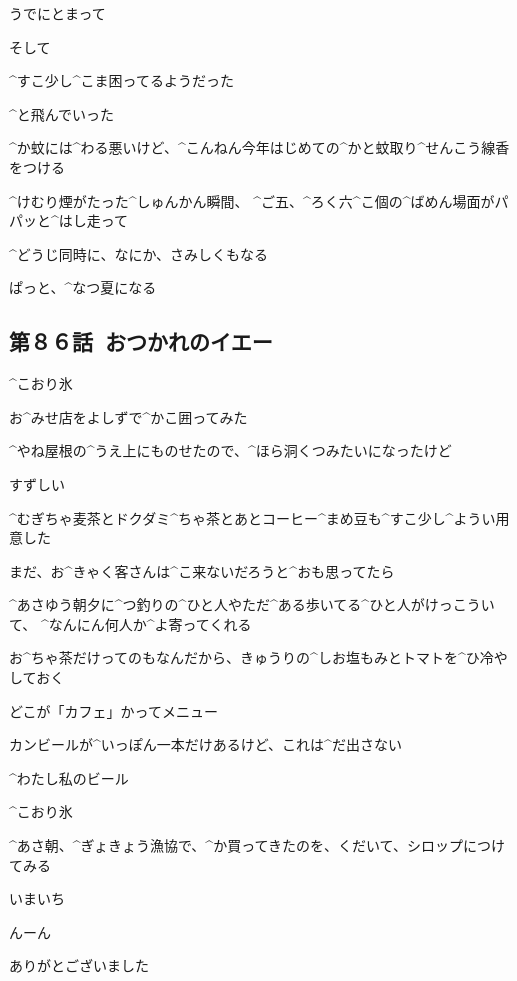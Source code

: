 \Alpha うでにとまって

\Alpha そして

\Alpha ^{すこ}{少}し^{こま}{困}ってるようだった

\Alpha ^{と}{飛}んでいった

\page
\Alpha ^{か}{蚊}には^{わる}{悪}いけど、^{こんねん}{今年}はじめての^{かと}{蚊取}り^{せんこう}{線香}をつける

\page
\Alpha ^{けむり}{煙}がたった^{しゅんかん}{瞬間}、
^{ご}{五}、^{ろく}{六}^{こ}{個}の^{ばめん}{場面}がパパッと^{はし}{走}って

\Alpha ^{どうじ}{同時}に、なにか、さみしくもなる

\page
\Alpha ぱっと、^{なつ}{夏}になる


\subsection{第８６話\ おつかれのイエー}

\page[131]
\Sign ^{こおり}{氷}

\Alpha お^{みせ}{店}をよしずで^{かこ}{囲}ってみた

\page
\Alpha ^{やね}{屋根}の^{うえ}{上}にものせたので、^{ほら}{洞}くつみたいになったけど

\Alpha すずしい

\Alpha ^{むぎちゃ}{麦茶}とドクダミ^{ちゃ}{茶}とあとコーヒー^{まめ}{豆}も^{すこ}{少}し^{ようい}{用意}した

\Alpha まだ、お^{きゃく}{客}さんは^{こ}{来}ないだろうと^{おも}{思}ってたら

\Alpha ^{あさゆう}{朝夕}に^{つ}{釣}りの^{ひと}{人}やただ^{ある}{歩}いてる^{ひと}{人}がけっこういて、
^{なんにん}{何人}か^{よ}{寄}ってくれる

\page
\Alpha お^{ちゃ}{茶}だけってのもなんだから、きゅうりの^{しお}{塩}もみとトマトを^{ひ}{冷}やしておく

\Alpha どこが「カフェ」かってメニュー

\Alpha カンビールが^{いっぽん}{一本}だけあるけど、これは^{だ}{出}さない

\Alpha ^{わたし}{私}のビール

\page
\Alpha ^{こおり}{氷}

\Alpha ^{あさ}{朝}、^{ぎょきょう}{漁協}で、^{か}{買}ってきたのを、くだいて、シロップにつけてみる

\Alpha いまいち

\Alpha んーん

\page
\Alpha ありがとございました

